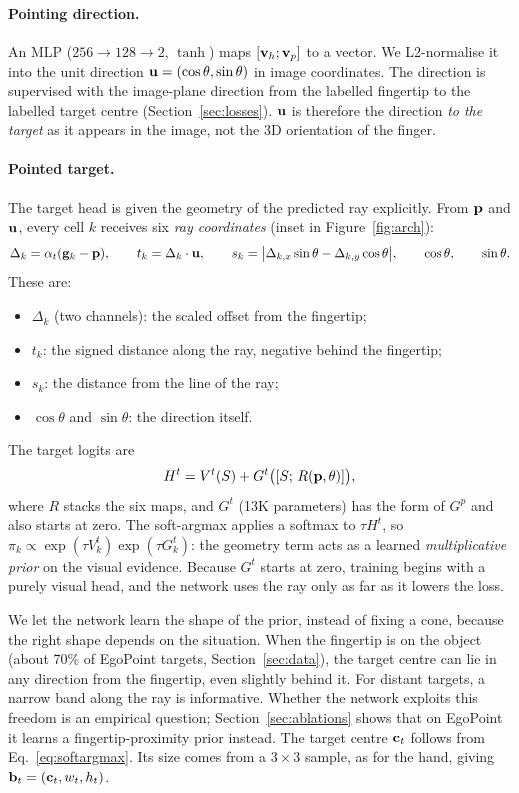 \paragraph{Pointing direction.} An MLP ($256\to128\to2$, $\tanh$) maps $[\mathbf{v}_h;\mathbf{v}_p]$ to a vector. We L2-normalise it into the unit direction $\mathbf{u}=(\cos\theta,\sin\theta)$ in image coordinates. The direction is supervised with the image-plane direction from the labelled fingertip to the labelled target centre (Section~\ref{sec:losses}). $\mathbf{u}$ is therefore the direction \emph{to the target} as it appears in the image, not the 3D orientation of the finger.

\paragraph{Pointed target.} The target head is given the geometry of the predicted ray explicitly. From $\mathbf{p}$ and $\mathbf{u}$, every cell $k$ receives six \emph{ray coordinates} (inset in Figure~\ref{fig:arch}):
\begin{equation}
\Delta_k=\alpha_t(\mathbf{g}_k-\mathbf{p}),\qquad
t_k=\Delta_k\cdot\mathbf{u},\qquad
s_k=\big|\Delta_{k,x}\sin\theta-\Delta_{k,y}\cos\theta\big|,\qquad
\cos\theta,\qquad \sin\theta .
\label{eq:raycoords}
\end{equation}
These are:
\begin{itemize}
\item $\Delta_k$ (two channels): the scaled offset from the fingertip;
\item $t_k$: the signed distance along the ray, negative behind the fingertip;
\item $s_k$: the distance from the line of the ray;
\item $\cos\theta$ and $\sin\theta$: the direction itself.
\end{itemize}
The target logits are
\begin{equation}
H^t = V^t(S) + G^t\big([S;\,R(\mathbf{p},\theta)]\big),
\label{eq:target}
\end{equation}
where $R$ stacks the six maps, and $G^t$ (13K parameters) has the form of $G^p$ and also starts at zero. The soft-argmax applies a softmax to $\tau H^t$, so $\pi_k\propto\exp(\tau V^t_k)\exp(\tau G^t_k)$: the geometry term acts as a learned \emph{multiplicative prior} on the visual evidence. Because $G^t$ starts at zero, training begins with a purely visual head, and the network uses the ray only as far as it lowers the loss.

We let the network learn the shape of the prior, instead of fixing a cone, because the right shape depends on the situation. When the fingertip is on the object (about 70\% of EgoPoint targets, Section~\ref{sec:data}), the target centre can lie in any direction from the fingertip, even slightly behind it. For distant targets, a narrow band along the ray is informative. Whether the network exploits this freedom is an empirical question; Section~\ref{sec:ablations} shows that on EgoPoint it learns a fingertip-proximity prior instead. The target centre $\mathbf{c}_t$ follows from Eq.~\eqref{eq:softargmax}. Its size comes from a $3\times3$ sample, as for the hand, giving $\mathbf{b}_t=(\mathbf{c}_t,w_t,h_t)$.

